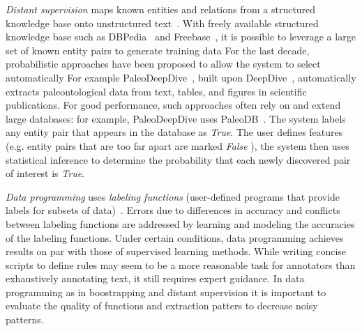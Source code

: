 \textit{Distant supervision} maps known entities and relations from a structured knowledge 
base onto unstructured text~\cite{peters2014machine,zhang2013geodeepdive}. 
With freely available structured knowledge base such as DBPedia~\cite{auer2007dbpedia} and Freebase~\cite{bollacker2008freebase}, it is possible to leverage a large set of known entity pairs to generate training data
For the last decade, probabilistic approaches have been proposed to allow the system to select automatically
For example PaleoDeepDive~\cite{peters2014machine}, built upon DeepDive~\cite{zhang2015deepdive}, automatically extracts
paleontological data from text, tables, and figures in scientific publications. 
For good performance, such approaches often rely on and extend large databases: for example,
PaleoDeepDive uses PaleoDB~\cite{PaleoDB}. 
The system labels any entity pair that appears in the database as \textit{True}.
The user defines features (e.g. entity pairs that are too far apart are marked \textit{False} ), the system then uses statistical inference to determine the probability that each newly discovered pair of interest is \textit{True}.

\textit{Data programming} uses
\textit{labeling functions} (user-defined programs that provide labels for subsets of data)~\cite{ratner2016data}. 
Errors due to differences in accuracy and conflicts between labeling functions are 
addressed by learning and modeling the accuracies of the labeling functions. 
Under certain conditions, data programming achieves results on par with those of supervised learning methods.
While writing concise scripts to define rules may seem to be a more reasonable task for annotators 
than exhaustively annotating text, it still requires expert guidance.  
In data programming as in boostrapping and distant supervision it is important to evaluate the quality of functions and extraction patters to decrease noisy patterns.

